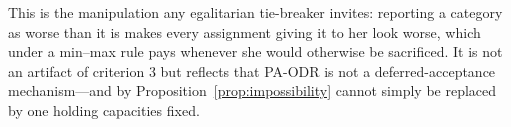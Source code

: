\documentclass[a4paper,twoside]{article}
\newtheorem{example}{Example}
\theoremstyle{definition}
\begin{document}
This is the manipulation any egalitarian tie-breaker invites: reporting a category as worse than it is makes every assignment giving it to her look worse, which under a min--max rule pays whenever she would otherwise be sacrificed. It is not an artifact of criterion 3 but reflects that PA-ODR is not a deferred-acceptance mechanism---and by Proposition~\ref{prop:impossibility} cannot simply be replaced by one holding capacities fixed.






\end{document}
